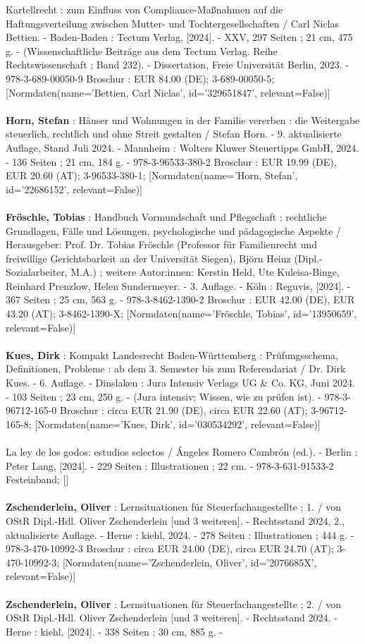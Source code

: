 \documentclass{article}
\begin{document}
\begin{multicols}{3}
Kartellrecht : zum Einfluss von Compliance-Maßnahmen auf die Haftungsverteilung zwischen Mutter- und Tochtergesellschaften / Carl Niclas Bettien. - Baden-Baden : Tectum Verlag, [2024]. - XXV, 297 Seiten ; 21 cm, 475 g. - (Wissenschaftliche Beiträge aus dem Tectum Verlag. Reihe Rechtswissenschaft ; Band 232). - Dissertation, Freie Universität Berlin, 2023. - 978-3-689-00050-9 Broschur : EUR 84.00 (DE); 3-689-00050-5; [Normdaten(name='Bettien, Carl Niclas', id='329651847', relevant=False)]\\\\\textbf{Horn, Stefan} : Häuser und Wohnungen in der Familie vererben : die Weitergabe steuerlich, rechtlich und ohne Streit gestalten / Stefan Horn. - 9. aktualisierte Auflage, Stand Juli 2024. - Mannheim : Wolters Kluwer Steuertipps GmbH, 2024. - 136 Seiten ; 21 cm, 184 g. - 978-3-96533-380-2 Broschur : EUR 19.99 (DE), EUR 20.60 (AT); 3-96533-380-1; [Normdaten(name='Horn, Stefan', id='22686152', relevant=False)]\\\\\textbf{Fröschle, Tobias} : Handbuch Vormundschaft und Pflegschaft : rechtliche Grundlagen, Fälle und Lösungen, psychologische und pädagogische Aspekte / Herausgeber: Prof. Dr. Tobias Fröschle (Professor für Familienrecht und freiwillige Gerichtsbarkeit an der Universität Siegen), Björn Heinz (Dipl.-Sozialarbeiter, M.A.) ; weitere Autor:innen: Kerstin Held, Ute Kuleisa-Binge, Reinhard Prenzlow, Helen Sundermeyer. - 3. Auflage. - Köln : Reguvis, [2024]. - 367 Seiten ; 25 cm, 563 g. - 978-3-8462-1390-2 Broschur : EUR 42.00 (DE), EUR 43.20 (AT); 3-8462-1390-X; [Normdaten(name='Fröschle, Tobias', id='13950659', relevant=False)]\\\\\textbf{Kues, Dirk} : Kompakt Landesrecht Baden-Württemberg : Prüfungsschema, Definitionen, Probleme : ab dem 3. Semester bis zum Referendariat / Dr. Dirk Kues. - 6. Auflage. - Dinslaken : Jura Intensiv Verlags UG \& Co. KG, Juni 2024. - 103 Seiten ; 23 cm, 250 g. - (Jura intensiv; Wissen, wie zu prüfen ist). - 978-3-96712-165-0 Broschur : circa EUR 21.90 (DE), circa EUR 22.60 (AT); 3-96712-165-8; [Normdaten(name='Kues, Dirk', id='030534292', relevant=False)]\\\\La ley de los godos: estudios selectos / Ángeles Romero Cambrón (ed.). - Berlin : Peter Lang, [2024]. - 229 Seiten : Illustrationen ; 22 cm. - 978-3-631-91533-2 Festeinband; []\\\\\textbf{Zschenderlein, Oliver} : Lernsituationen für Steuerfachangestellte ; 1. / von OStR Dipl.-Hdl. Oliver Zschenderlein [und 3 weiteren]. - Rechtsstand 2024, 2., aktualisierte Auflage. - Herne : kiehl, 2024. - 278 Seiten : Illustrationen ; 444 g. - 978-3-470-10992-3 Broschur : circa EUR 24.00 (DE), circa EUR 24.70 (AT); 3-470-10992-3; [Normdaten(name='Zschenderlein, Oliver', id='2076685X', relevant=False)]\\\\\textbf{Zschenderlein, Oliver} : Lernsituationen für Steuerfachangestellte ; 2. / von OStR Dipl.-Hdl. Oliver Zschenderlein [und 3 weiteren]. - Rechtsstand 2024. - Herne : kiehl, [2024]. - 338 Seiten ; 30 cm, 885 g. - 
\end{multicols}
\end{document}

